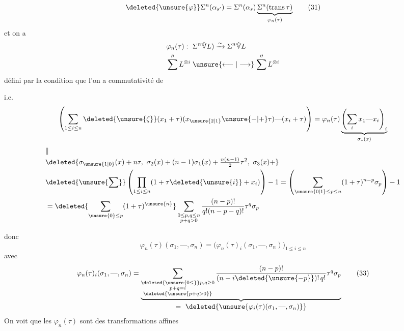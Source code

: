 \[
\deleted{\unsure{\varphi}}\Sigma^n(\alpha_{s'})=\Sigma^n(\alpha_s)\underbrace{\Sigma^n(\operatorname{trans}\tau)}_{\varphi_n(\tau)} \tag*{(31)}
\]
et  on a
\[
\begin{aligned}
&\varphi_n(\tau):\ \Sigma^n\check{\mathbb V}L)\xrightarrow{\sim}\Sigma^n\check{\mathbb V}L\\
&\sum^{\prime\prime} L^{\otimes i}\mathrel{\unsure{\longleftarrow|\longrightarrow}}\sum^{\prime\prime}L^{\otimes i}
\end{aligned}
\]
défini par la condition que l'on a commutativité de


i.e.
\[
\left(\sum_{1\le i\le n}\deleted{\unsure{\zeta}}(x_1+\tau)(x_{\unsure{2|1}}\unsure{-|+}\tau)\text{---}(x_i+\tau)\right)
=\varphi_n(\tau)\underbrace{\left(\sum_i x_1\text{---}x_i\right)_i}_{\sigma_*(x)}
\]
\[
\begin{aligned}
&\Vert\\[-2pt]
&\deleted{\sigma_{\unsure{1|0}}(x)+n\tau,\ \sigma_2(x)+(n-1)\sigma_1(x)+\tfrac{n(n-1)}2\tau^2,\ \sigma_3(x)+}\\
&\deleted{\unsure{\sum}}\left(\prod_{1\le i\le n}(1+\tau\deleted{\unsure{i}}+x_i)\right)-1
=\left(\sum_{\unsure{0|1}\le p\le n}(1+\tau)^{n-p}\sigma_p\right)-1\\
&=\deleted{\sum_{\unsure{0}\le p}(1+\tau)^{\unsure{n}}}
\sum_{\substack{0\le p,q\le n\\p+q>0}}\frac{(n-p)!}{q!(n-p-q)!}\tau^q\sigma_p
\end{aligned}
\]

donc
\[
\varphi_n(\tau)(\sigma_1,\text{---},\sigma_n)=
 \bigl(\varphi_n(\tau)_i(\sigma_1,\text{---},\sigma_n)\bigr)_{1\le i\le n} \tag*{(32)}
\]
avec
\[
\varphi_n(\tau)_i(\sigma_1,\text{---},\sigma_n)=
\underbrace{\sum_{\substack{\deleted{\unsure{0\le}}p,q\ge0\\p+q=i\\\deleted{\unsure{p+q>0}}}}
\frac{(n-p)!}{(n-i\deleted{\unsure{-p}})!\,q!}\tau^q\sigma_p}_{\displaystyle =\ \deleted{\unsure{\varphi_i(\tau)(\sigma_1,\text{---},\sigma_n)}}}
\tag*{(33)}
\]
On voit que les $\varphi_n(\tau)$ sont des transformations affines


